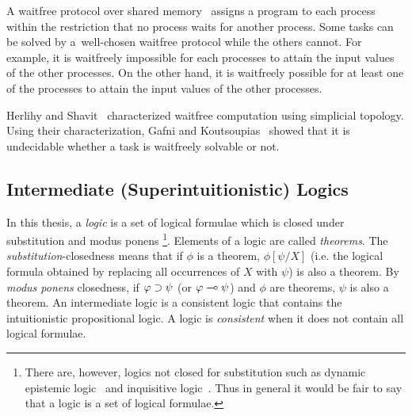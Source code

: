 A waitfree protocol over shared memory~\cite{herlihy1991wait}
 assigns a program to each process within the restriction that
 no process waits for another process.
Some tasks can be solved by a~well-chosen waitfree protocol while the
 others cannot.
 For example,
 it is waitfreely impossible for each processes to attain the input
 values of the other processes.
 On the other hand, it is waitfreely possible for
 at least one of the processes to attain the input values of the other
 processes.

Herlihy and Shavit~\cite{Herlihy99} characterized waitfree
computation using
simplicial topology.
Using their characterization,
Gafni and Koutsoupias~\cite{gafni1999three}
 showed that it is undecidable whether a task is waitfreely solvable
 or not.

\subsection{Intermediate (Superintuitionistic) Logics}

In this thesis,
a \textit{logic} is a set of logical formulae which is
closed under substitution and modus ponens%
\footnote{There are, however, logics not closed for substitution such as
dynamic epistemic logic~\citep{ditmarsch2007dynamic} and
inquisitive logic~\citep{ciardelli2011}.  Thus
in general it would be fair to say that a logic is a set of logical
formulae.}.
Elements of a logic are called \textit{theorems}.
The \textit{substitution}-closedness means
 that if $\phi$ is a
theorem, $\phi[\psi/X]$ (i.e. the
logical formula obtained by replacing all occurrences of $X$ with
$\psi$) is also a theorem.
By \textit{modus ponens} closedness, if
$\varphi\supset\psi$ (or $\varphi\multimap\psi$) and $\phi$ are
theorems, $\psi$ is also a theorem.
An intermediate logic is a consistent logic
that contains the intuitionistic propositional logic.  A logic is
\textit{consistent} when it does not
contain all logical formulae.

